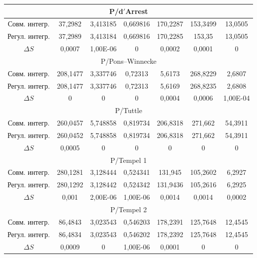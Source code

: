 \begin{table}[p!]
\begin{minipage}[t]{128mm}
\begin{tabular}{c|c|c|c|c|c|c}
\multicolumn{7}{c}{P/d$'$Arrest	}	\\	\hline
Совм. интегр.	&	37,2982	&	3,413185	&	0,669816	&	170,2287	&	153,3499	&	13,0505	\\
Регул. интегр.	&	37,2989	&	3,413184	&	0,669816	&	170,2285	&	153,35	&	13,0505	\\
$\Delta S$	&	0,0007	&	1,00E-06	&	0	&	0,0002	&	0,0001	&	0	\\	\hline
\multicolumn{7}{c}{P/Pons--Winnecke	}	\\	\hline
Совм. интегр.	&	208,1477	&	3,337746	&	0,72313	&	5,6173	&	268,8229	&	2,6807	\\
Регул. интегр.	&	208,1477	&	3,337746	&	0,72313	&	5,6169	&	268,8235	&	2,6808	\\
$\Delta S$	&	0	&	0	&	0	&	0,0004	&	0,0006	&	1,00E-04	\\	\hline
\multicolumn{7}{c}{P/Tuttle	}	\\	\hline
Совм. интегр.	&	260,0457	&	5,748858	&	0,819734	&	206,8318	&	271,662	&	54,3911	\\
Регул. интегр.	&	260,0452	&	5,748858	&	0,819734	&	206,8318	&	271,662	&	54,3911	\\
$\Delta S$	&	0,0005	&	0	&	0	&	0	&	0	&	0	\\	\hline
\multicolumn{7}{c}{P/Tempel 1	}	\\	\hline
Совм. интегр.	&	280,1281	&	3,128444	&	0,524341	&	131,945	&	105,2602	&	6,2927	\\
Регул. интегр.	&	280,1292	&	3,128442	&	0,524342	&	131,9436	&	105,2616	&	6,2925	\\
$\Delta S$	&	0,001	&	2,00E-06	&	1,00E-06	&	0,0014	&	0,0014	&	0,0002	\\	\hline
\multicolumn{7}{c}{P/Tempel 2	}	\\	\hline
Совм. интегр.	&	86,4843	&	3,023543	&	0,546203	&	178,2391	&	125,7648	&	12,4545	\\
Регул. интегр.	&	86,4834	&	3,023543	&	0,546202	&	178,2392	&	125,7648	&	12,4545	\\
$\Delta S$	&	0,0009	&	0	&	1,00E-06	&	0,0001	&	0	&	0	\\	\hline
\end{tabular}
\label{table:zausaev:tabl1}
\end{minipage}
\end{table}

